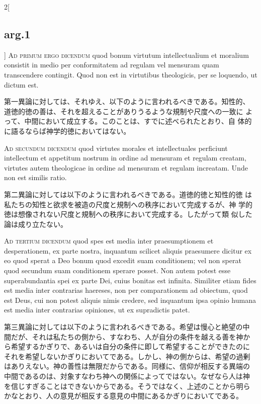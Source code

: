 \documentclass[paper=a4paper,fontsize=10pt,jafontsize=9pt,titlepage]{jlreq}
\begin{document}
\begin{paracol}{2}[\subsection{arg.1}]
{\scshape Ad primum ergo dicendum} quod bonum virtutum
 intellectualium et moralium consistit in medio per conformitatem ad
 regulam vel mensuram quam transcendere contingit. Quod non est in
 virtutibus theologicis, per se loquendo, ut dictum est.

\switchcolumn

第一異論に対しては、それゆえ、以下のように言われるべきである。知性的、
 道徳的徳の善は、それを超えることがありうるような規制や尺度への一致に
 よって、中間において成立する。このことは、すでに述べられたとおり、自
 体的に語るならば神学的徳においてはない。

\switchcolumn*[\subsection{ad.2}]

{\scshape Ad secundum dicendum} quod virtutes morales et
intellectuales perficiunt intellectum et appetitum nostrum in ordine
ad mensuram et regulam creatam, virtutes autem theologicae in ordine
ad mensuram et regulam increatam. Unde non est similis ratio.

\switchcolumn

第二異論に対しては以下のように言われるべきである。道徳的徳と知性的徳
 は私たちの知性と欲求を被造の尺度と規制への秩序において完成するが、神
 学的徳は想像されない尺度と規制への秩序において完成する。したがって類
 似した論は成り立たない。

\switchcolumn*[\subsection{ad.3}]

{\scshape Ad tertium dicendum} quod spes est media inter
praesumptionem et desperationem, ex parte nostra, inquantum scilicet
aliquis praesumere dicitur ex eo quod sperat a Deo bonum quod excedit
suam conditionem; vel non sperat quod secundum suam conditionem
sperare posset. Non autem potest esse superabundantia spei ex parte
Dei, cuius bonitas est infinita. Similiter etiam fides est media inter
contrarias haereses, non per comparationem ad obiectum, quod est Deus,
cui non potest aliquis nimis credere, sed inquantum ipsa opinio humana
est media inter contrarias opiniones, ut ex supradictis patet.

\switchcolumn

第三異論に対しては以下のように言われるべきである。希望は慢心と絶望の中
間だが、それは私たちの側から、すなわち、人が自分の条件を越える善を神か
ら希望するかぎりで、あるいは自分の条件に即して希望することができたのに
それを希望しないかぎりにおいてである。しかし、神の側からは、希望の過剰
はありえない。神の善性は無限だからである。同様に、信仰が相反する異端の
中間であるのは、対象すなわち神への関係によってではない。なぜなら人は神
を信じすぎることはできないからである。そうではなく、上述のことから明ら
かなとおり、人の意見が相反する意見の中間にあるかぎりにおいてである。

\end{paracol}
\end{document}
